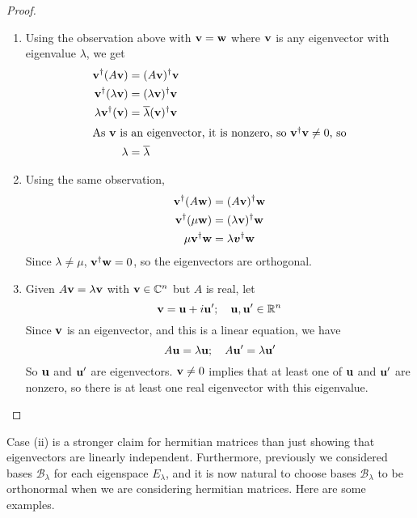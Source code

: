 \begin{proof}
	\begin{enumerate}
		\item Using the observation above with \(\vb v = \vb w\) where \(\vb v\) is any eigenvector with eigenvalue \(\lambda\), we get
		      \begin{align*}
			      \vb v^\dagger (A\vb v)        & = (A\vb v)^\dagger \vb v                   \\
			      \vb v^\dagger (\lambda\vb v)  & = (\lambda\vb v)^\dagger \vb v             \\
			      \lambda \vb v^\dagger (\vb v) & = \overline{\lambda} (\vb v)^\dagger \vb v \\
			      \intertext{As \(\vb v\) is an eigenvector, it is nonzero, so \(\vb v^\dagger \vb v \neq 0\), so}
			      \lambda                       & = \overline \lambda
		      \end{align*}
		\item Using the same observation,
		      \begin{align*}
			      \vb v^\dagger (A \vb w)   & = (A \vb v)^\dagger \vb w       \\
			      \vb v^\dagger (\mu \vb w) & = (\lambda \vb v)^\dagger \vb w \\
			      \mu \vb v^\dagger \vb w   & = \lambda \bm v^\dagger \vb w
		      \end{align*}
		      Since \(\lambda \neq \mu\), \(\vb v^\dagger \vb w = 0\), so the eigenvectors are orthogonal.
		\item Given \(A\vb v = \lambda \vb v\) with \(\vb v \in \mathbb C^n\) but \(A\) is real, let
		      \[
			      \vb v = \vb u + i\vb u';\quad \vb u, \vb u' \in \mathbb R^n
		      \]
		      Since \(\vb v\) is an eigenvector, and this is a linear equation, we have
		      \[
			      A\vb u = \lambda \vb u;\quad A\vb u' = \lambda \vb u'
		      \]
		      So \(\vb u\) and \(\vb u'\) are eigenvectors.
		      \(\vb v \neq 0\) implies that at least one of \(\vb u\) and \(\vb u'\) are nonzero, so there is at least one real eigenvector with this eigenvalue.
	\end{enumerate}
\end{proof}
Case (ii) is a stronger claim for hermitian matrices than just showing that eigenvectors are linearly independent.
Furthermore, previously we considered bases \(\mathcal B_\lambda\) for each eigenspace \(E_\lambda\), and it is now natural to choose bases \(\mathcal B_\lambda\) to be orthonormal when we are considering hermitian matrices.
Here are some examples.
